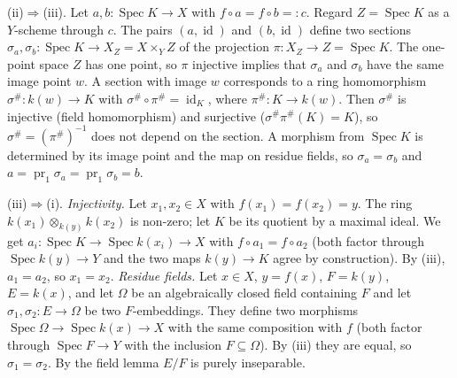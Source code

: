 \documentclass[11pt]{article}
\begin{document}
(ii)$\Rightarrow$(iii). Let $a,b:\operatorname{Spec}K\to X$ with $f\circ a=f\circ b=:c$. Regard $Z=\operatorname{Spec}K$ as a $Y$-scheme through $c$. The pairs $(a,\operatorname{id})$ and $(b,\operatorname{id})$ define two sections $\sigma_a,\sigma_b:\operatorname{Spec}K\to X_Z=X\times_YZ$ of the projection $\pi:X_Z\to Z=\operatorname{Spec}K$. The one-point space $Z$ has one point, so $\pi$ injective implies that $\sigma_a$ and $\sigma_b$ have the same image point $w$. A section with image $w$ corresponds to a ring homomorphism $\sigma^\#:k(w)\to K$ with $\sigma^\#\circ\pi^\#=\operatorname{id}_K$, where $\pi^\#:K\to k(w)$. Then $\sigma^\#$ is injective (field homomorphism) and surjective ($\sigma^\#\pi^\#(K)=K$), so $\sigma^\#=(\pi^\#)^{-1}$ does not depend on the section. A morphism from $\operatorname{Spec}K$ is determined by its image point and the map on residue fields, so $\sigma_a=\sigma_b$ and $a=\operatorname{pr}_1\sigma_a=\operatorname{pr}_1\sigma_b=b$.

(iii)$\Rightarrow$(i). \emph{Injectivity.} Let $x_1,x_2\in X$ with $f(x_1)=f(x_2)=y$. The ring $k(x_1)\otimes_{k(y)}k(x_2)$ is non-zero; let $K$ be its quotient by a maximal ideal. We get $a_i:\operatorname{Spec}K\to\operatorname{Spec}k(x_i)\to X$ with $f\circ a_1=f\circ a_2$ (both factor through $\operatorname{Spec}k(y)\to Y$ and the two maps $k(y)\to K$ agree by construction). By (iii), $a_1=a_2$, so $x_1=x_2$. \emph{Residue fields.} Let $x\in X$, $y=f(x)$, $F=k(y)$, $E=k(x)$, and let $\Omega$ be an algebraically closed field containing $F$ and let $\sigma_1,\sigma_2:E\to\Omega$ be two $F$-embeddings. They define two morphisms $\operatorname{Spec}\Omega\to\operatorname{Spec}k(x)\to X$ with the same composition with $f$ (both factor through $\operatorname{Spec}F\to Y$ with the inclusion $F\subseteq\Omega$). By (iii) they are equal, so $\sigma_1=\sigma_2$. By the field lemma $E/F$ is purely inseparable.
\end{document}
